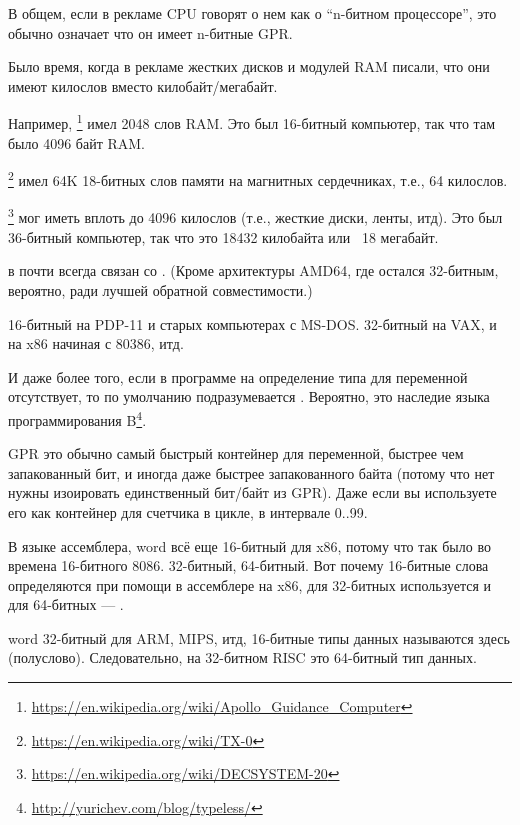 В общем, если в рекламе CPU говорят о нем как о ``n-битном процессоре'', это обычно означает что он имеет n-битные \ac{GPR}.

Было время, когда в рекламе жестких дисков и модулей \ac{RAM} писали, что они имеют  килослов вместо
 килобайт/мегабайт.

Например, \footnote{\url{https://en.wikipedia.org/wiki/Apollo_Guidance_Computer}}
имел 2048 слов \ac{RAM}.
Это был 16-битный компьютер, так что там было 4096 байт \ac{RAM}.

\footnote{\url{https://en.wikipedia.org/wiki/TX-0}} имел 64K 18-битных слов памяти на магнитных сердечниках,
т.е., 64 килослов.

\footnote{\url{https://en.wikipedia.org/wiki/DECSYSTEM-20}}
мог иметь вплоть до 4096 килослов 
(т.е., жесткие диски, ленты, итд).
Это был 36-битный компьютер, так что это 18432 килобайта или ~18 мегабайт.

\myhrule{}

 в \CCpp почти всегда связан со .
(Кроме архитектуры AMD64, где  остался 32-битным, вероятно, ради лучшей обратной совместимости.)

 16-битный на PDP-11 и старых компьютерах с MS-DOS.
 32-битный на VAX, и на x86 начиная с 80386, итд.

И даже более того, если в программе на \CCpp{} определение типа для переменной отсутствует,
то по умолчанию подразумевается .
Вероятно, это наследие языка программирования B\footnote{\url{http://yurichev.com/blog/typeless/}}.

\myhrule{}

\ac{GPR} это обычно самый быстрый контейнер для переменной, быстрее чем запакованный бит, и иногда даже быстрее запакованного
байта (потому что нет нужны изоировать единственный бит/байт из \ac{GPR}).
Даже если вы используете его как контейнер для счетчика в цикле, в интервале 0..99.

\myhrule{}

В языке ассемблера, \gls{word} всё еще 16-битный для x86, потому что так было во времена 16-битного 8086.
 32-битный,  64-битный.
Вот почему 16-битные слова определяются при помощи  в ассемблере на x86, для 32-битных используется 
и для 64-битных --- .

\Gls{word} 32-битный для ARM, MIPS, итд, 16-битные типы данных называются здесь  (полуслово).
Следовательно,  на 32-битном RISC это 64-битный тип данных.

